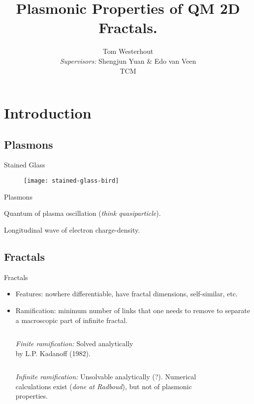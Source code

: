 \documentclass{beamer}
\title{Plasmonic Properties of QM 2D Fractals.}
\author{Tom Westerhout \\ 
        \emph{Supervisors:} Shengjun Yuan \& Edo van Veen \\
        TCM}
\date{}
\begin{document}
\begin{frame}
    \titlepage
\end{frame}

\section{Introduction}

\subsection{Plasmons}

\begin{frame}{Stained Glass}
    \begin{figure}
    \texttt{[image: stained-glass-bird]}
    \end{figure}
\end{frame}

\begin{frame}{Plasmons}
    \begin{definition}[Plasmon]
        Quantum of plasma oscillation (\emph{think quasiparticle}).
    \end{definition}

    \begin{definition}
        Longitudinal wave of electron charge-density.
    \end{definition}
\end{frame}

\subsection{Fractals}

\begin{frame}{Fractals}
    \begin{itemize}
    \item Features: nowhere differentiable, have fractal dimensions, self-similar, etc.
    \item Ramification: minimum number of links that one needs to remove to separate a macroscopic part of infinite fractal.
        \begin{columns}[T]
            \emph{Finite ramification:} \alert{Solved analytically} \\ by L.P. Kadanoff (1982).
            \begin{figure}
            
            \end{figure}
        \end{columns}

        \begin{columns}[T]
            \emph{Infinite ramification:} \alert{Unsolvable analytically} (?). Numerical calculations exist (\emph{done at Radboud}), but not of plasmonic properties.
            \begin{figure}
            
            \end{figure}
        \end{columns}
    \end{itemize}
\end{frame}
\end{document}
